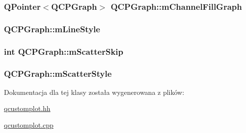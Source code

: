 \subsubsection[{\texorpdfstring{m\+Channel\+Fill\+Graph}{mChannelFillGraph}}]{\setlength{\rightskip}{0pt plus 5cm}Q\+Pointer$<${\bf Q\+C\+P\+Graph}$>$ Q\+C\+P\+Graph\+::m\+Channel\+Fill\+Graph\hspace{0.3cm}{\ttfamily [protected]}}\hypertarget{class_q_c_p_graph_a2f1777c7accf8244fc640c33f0b04577}{}\label{class_q_c_p_graph_a2f1777c7accf8244fc640c33f0b04577}
\subsubsection[{\texorpdfstring{m\+Line\+Style}{mLineStyle}}]{ Q\+C\+P\+Graph\+::m\+Line\+Style\hspace{0.3cm}{\ttfamily [protected]}}\hypertarget{class_q_c_p_graph_a8604fd98402035a63375849f7341ee25}{}\label{class_q_c_p_graph_a8604fd98402035a63375849f7341ee25}
\subsubsection[{\texorpdfstring{m\+Scatter\+Skip}{mScatterSkip}}]{\setlength{\rightskip}{0pt plus 5cm}int Q\+C\+P\+Graph\+::m\+Scatter\+Skip\hspace{0.3cm}{\ttfamily [protected]}}\hypertarget{class_q_c_p_graph_a4ca1e50fbfe8307022b42a6f6178fae0}{}\label{class_q_c_p_graph_a4ca1e50fbfe8307022b42a6f6178fae0}
\subsubsection[{\texorpdfstring{m\+Scatter\+Style}{mScatterStyle}}]{ Q\+C\+P\+Graph\+::m\+Scatter\+Style\hspace{0.3cm}{\ttfamily [protected]}}\hypertarget{class_q_c_p_graph_a4aa36241f166ccd1f75fc8f24e4a3247}{}\label{class_q_c_p_graph_a4aa36241f166ccd1f75fc8f24e4a3247}


Dokumentacja dla tej klasy została wygenerowana z plików\+:\begin{DoxyCompactItemize}
\item 
\hyperlink{qcustomplot_8hh}{qcustomplot.\+hh}\item 
\hyperlink{qcustomplot_8cpp}{qcustomplot.\+cpp}\end{DoxyCompactItemize}
